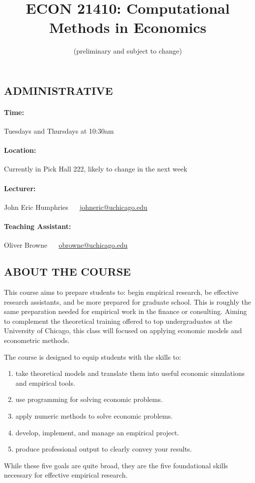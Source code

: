 \documentclass{scrartcl}
\title{ECON 21410: Computational Methods in Economics}
\subtitle{(preliminary and subject to change)}
\date{}
\begin{document}
\maketitle


\subsection*{ADMINISTRATIVE}

\paragraph{Time:} Tuesdays and Thursdays at 10:30am

\paragraph{Location:} Currently in Pick Hall 222, likely to change in the next week

\paragraph{Lecturer:}  
John Eric Humphries ~~ \href{mailto:johneric@uchicago.edu}{johneric@uchicago.edu}

\paragraph{Teaching Assistant:}
Oliver Browne ~~  \href{mailto:obrowne@uchicago.edu}{obrowne@uchicago.edu}


\subsection*{ABOUT THE COURSE}

This course aims to prepare students to: begin empirical research, be effective research assistants, and be more prepared for graduate school. This is roughly the same preparation needed for empirical work in the finance or consulting. Aiming to complement the theoretical training offered to top undergraduates at the University of Chicago, this class will focused on applying economic models and econometric methods. 

\pagebreak

The course is designed to equip students with the skills to:
\begin{enumerate}
\item take theoretical models and translate them into useful economic simulations and empirical tools.
\item use programming for solving economic problems.
\item apply numeric methods to solve economic problems.
\item develop, implement, and manage an empirical project.
\item produce professional output to clearly convey your results.
\end{enumerate}
While these five goals are quite broad, they are the five foundational skills necessary for effective empirical research. 
\end{document}
